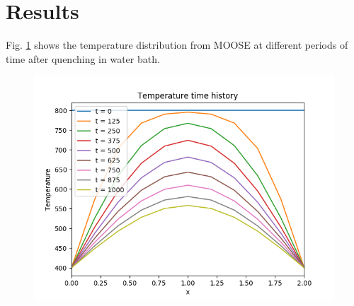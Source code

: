 \documentclass[12pt]{article}
\begin{document}
\section*{Results}
Fig. \ref{time_history} shows the temperature distribution from MOOSE at different periods of time after quenching in water bath.  
\begin{figure}[h]
\includegraphics[]{T_time_history.png}
\caption{}
\label{time_history}
\end{figure}
\end{document}

